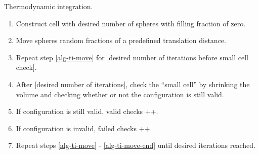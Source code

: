 \documentclass[12pt]{article}
\newcommand{\ignore}[1]{}
\newenvironment{alg}{\hrulefill\begin{enumerate}}{\end{enumerate}\hrulefill}
\begin{document}
\begin{algorithm}[!b]
\caption{Thermodynamic integration.}
\label{alg:ti}
\begin{alg}
\item Construct cell with desired number of spheres with filling fraction of zero.
\item Move spheres random fractions of a predefined translation distance. \label{alg-ti-move}
\item Repeat step \ref{alg-ti-move} for [desired number of iterations before small cell check].
\item After [desired number of iterations], check the ``small cell'' by shrinking the volume and checking whether or not the configuration is still valid.
\item If configuration is still valid, valid checks ++.
\item If configuration is invalid, failed checks ++. \label{alg-ti-move-end}
\item Repeat steps \ref{alg-ti-move} - \ref{alg-ti-move-end} until desired iterations reached.

\end{alg}      
\end{algorithm}  

\ignore{Should I detail the algorithm itself and string simulations together or consider the entire process $\eta=0\rightarrow\eta_max$ to be the algorithm?}



\ignore{is the distinction between infinite case and regular necessary? we always use infinite...}
\end{document}
